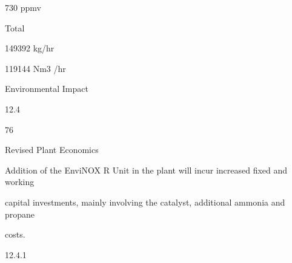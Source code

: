 \documentclass[a4paper,portrait,12pt]{article}
\begin{document}
\begin{flushleft}
730 ppmv
\end{flushleft}





\begin{flushleft}
Total
\end{flushleft}





\begin{flushleft}
149392 kg/hr
\end{flushleft}





\begin{flushleft}
119144 Nm3 /hr
\end{flushleft}





\begin{flushleft}
\newpage
Environmental Impact
\end{flushleft}





12.4





76





\begin{flushleft}
Revised Plant Economics
\end{flushleft}





\begin{flushleft}
Addition of the EnviNOX R Unit in the plant will incur increased fixed and working
\end{flushleft}


\begin{flushleft}
capital investments, mainly involving the catalyst, additional ammonia and propane
\end{flushleft}


\begin{flushleft}
costs.
\end{flushleft}





12.4.1
\end{document}
